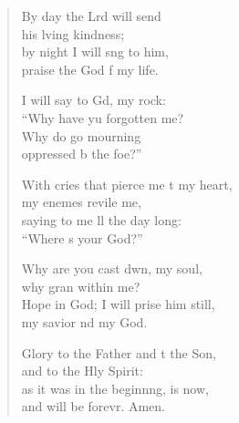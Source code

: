 \begin{verse}
\begin{patverse}
By day the Lrd will send\Med\\
his lving kindness;\\
by night I will s\pointup{\i}ng to him,\Med\\
praise the God f my life.

I will say to Gd, my rock:\Med\\
“Why have yu forgotten me?\\
Why do  go mourning\Med\\
oppressed b the foe?”

With cries that pierce me t my heart,\Med\\
my enem\pointup{\i}es revile me,\\
saying to me ll the day long:\Med\\
“Where \pointup{\i}s your God?”

Why are you cast dwn, my soul,\Med\\
why gran within me?\\
Hope in God; I will prise him still,\Med\\
my savior nd my God.

Glory to the Father and t the Son,\Med\\
and to the Hly Spirit:\\
as it was in the beginn\pointup{\i}ng, is now,\Med\\
and will be forevr. Amen. 
  \end{patverse}
\end{verse}
